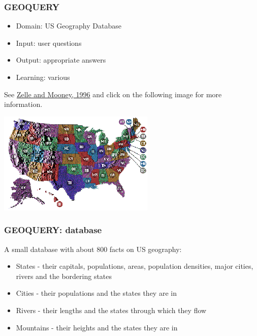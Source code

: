 \documentclass[ignorenonframetext]{beamer}
\begin{document}
\begin{frame}\frametitle{GEOQUERY}

\begin{itemize}
\item Domain: US Geography Database
\item Input: user questions
\item Output: appropriate answers
\item Learning: various
\end{itemize}

See \href{http://aaaipress.org/Papers/AAAI/1996/AAAI96-156.pdf}{Zelle
  and Mooney, 1996}
and click on the following image for more information.

\begin{center}
\href{http://www.cs.utexas.edu/users/ml/geo.html}{
\includegraphics[width=.7\textwidth]{us-states.png}}
\end{center}

\end{frame}

\begin{frame}\frametitle{GEOQUERY: database}
A small database with about 800 facts on US geography:
\begin{itemize}
\item States - their capitals, populations, areas, population densities,
major cities, rivers and the bordering states
\item Cities - their populations and the states they are in
\item Rivers - their lengths and the states through which they flow
\item Mountains - their heights and the states they are in
\end{itemize}

\end{frame}
\end{document}
